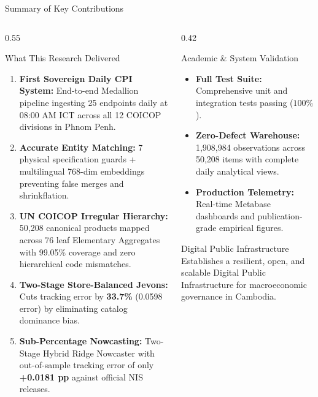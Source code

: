 \documentclass[aspectratio=169, 10pt]{beamer}
\begin{document}
\begin{frame}[shrink=10]{Summary of Key Contributions}
  \begin{columns}
    \begin{column}{0.55\textwidth}
      \begin{block}{What This Research Delivered}
        \begin{enumerate}
          \item \textbf{First Sovereign Daily CPI System:} End-to-end Medallion pipeline ingesting 25 endpoints daily at 08:00 AM ICT across all 12 COICOP divisions in Phnom Penh.
          \item \textbf{Accurate Entity Matching:} 7 physical specification guards + multilingual 768-dim embeddings preventing false merges and shrinkflation.
          \item \textbf{UN COICOP Irregular Hierarchy:} 50,208 canonical products mapped across 76 leaf Elementary Aggregates with 99.05\% coverage and zero hierarchical code mismatches.
          \item \textbf{Two-Stage Store-Balanced Jevons:} Cuts tracking error by \textbf{33.7\%} (0.0598 error) by eliminating catalog dominance bias.
          \item \textbf{Sub-Percentage Nowcasting:} Two-Stage Hybrid Ridge Nowcaster with out-of-sample tracking error of only \textbf{+0.0181 pp} against official NIS releases.
        \end{enumerate}
      \end{block}
    \end{column}

    \begin{column}{0.42\textwidth}
      \begin{exampleblock}{Academic \& System Validation}
        \begin{itemize}
          \item \textbf{Full Test Suite:} Comprehensive unit and integration tests passing ($100\%$).
          \item \textbf{Zero-Defect Warehouse:} 1,908,984 observations across 50,208 items with complete daily analytical views.
          \item \textbf{Production Telemetry:} Real-time Metabase dashboards and publication-grade empirical figures.
        \end{itemize}
      \end{exampleblock}

      \begin{alertblock}{Digital Public Infrastructure}
        Establishes a resilient, open, and scalable Digital Public Infrastructure for macroeconomic governance in Cambodia.
      \end{alertblock}
    \end{column}
  \end{columns}
\end{frame}
\end{document}
